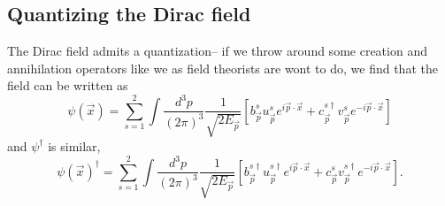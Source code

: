 \subsection*{Quantizing the Dirac field} The Dirac field admits a quantization-- if we throw around some creation and annihilation operators like we as field theorists are wont to do, we find that the field can be written as
$$\psi(\vec x)=\sum_{s=1}^2 \int \frac{d^3p}{(2\pi)^3}\frac{1}{\sqrt{2E_{\vec p}}} \left[ b_{\vec p}^s u_{\vec p}^s e^{i\vec p \cdot \vec x} +c_{\vec p}^{s\dagger} v_{\vec p}^s e^{-i \vec p \cdot \vec x}\right]$$
and $\psi^\dagger$ is similar,
$$\psi(\vec x)^\dagger=\sum_{s=1}^2 \int \frac{d^3p}{(2\pi)^3}\frac{1}{\sqrt{2E_{\vec p}}} \left[ b_{\vec p}^{s\dagger} u_{\vec p}^{s\dagger} e^{i\vec p \cdot \vec x} +c_{\vec p}^{s} v_{\vec p}^{s\dagger} e^{-i \vec p \cdot \vec x}\right].$$